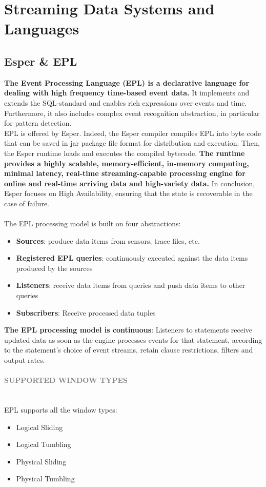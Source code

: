 \documentclass[10pt,a4paper]{article}
\newcommand{\nline}{\\~\\}
\newcommand{\myparagraph}[1]{\paragraph{\normalsize{\textcolor{gray}{\uppercase{\textbf{#1}}}} }\mbox{} \vspace{0.5em}\\}
\begin{document}
\pagebreak

\section{Streaming Data Systems and Languages}
\subsection{Esper \& EPL}
\textbf{The Event Processing Language (EPL) is a declarative language for dealing with high frequency time-based event data.} It implements and extends the SQL-standard and enables rich expressions over events and time. Furthermore, it also includes complex event recognition abstraction, in particular for pattern detection.  \\
EPL is offered by Esper. Indeed, the Esper compiler compiles EPL into byte code that can be saved in jar package file format for distribution and execution. Then, the Esper runtime loads and executes the compiled bytecode. \textbf{The runtime provides a highly scalable, memory-efficient, in-memory computing, minimal latency, real-time streaming-capable processing engine for online and real-time arriving data and high-variety data.} In conclusion, Esper focuses on High Availability, ensuring that the state is recoverable in the case of failure.
\nline
The EPL processing model is built on four abstractions:
\begin{itemize}
	\item \textbf{Sources}: produce data items from sensors, trace files, etc.
	\item \textbf{Registered EPL queries}: continuously executed against the data items produced by the sources
	\item \textbf{Listeners}: receive data items from queries and push data items to other queries
	\item \textbf{Subscribers}: Receive processed data tuples
\end{itemize}
\textbf{The EPL processing model is continuous}:
Listeners to statements receive updated data as soon as the engine processes events for that statement, according to the statement’s choice of event streams, retain clause restrictions, filters and output rates.
\myparagraph{Supported Window Types}
EPL supports all the window types:
\begin{itemize}
	\item Logical Sliding
	\item Logical Tumbling
	\item Physical Sliding
	\item Physical Tumbling
\end{itemize}
\end{document}
